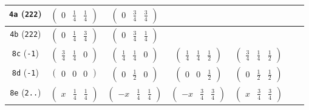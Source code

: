 \documentclass[fleqn,9pt,landscape]{jsarticle}
\begin{document}
\begin{center}
\begin{longtable}{ccccccc}
{\tt 4a} ({\tt 222}) & $ \begin{pmatrix} 0 & \frac{1}{4} & \frac{1}{4} \end{pmatrix} $ & $ \begin{pmatrix} 0 & \frac{3}{4} & \frac{3}{4} \end{pmatrix} $ & $  $ & $  $ & $  $ & $  $ \\ \hline
{\tt 4b} ({\tt 222}) & $ \begin{pmatrix} 0 & \frac{1}{4} & \frac{3}{4} \end{pmatrix} $ & $ \begin{pmatrix} 0 & \frac{3}{4} & \frac{1}{4} \end{pmatrix} $ & $  $ & $  $ & $  $ & $  $ \\ \hline
{\tt 8c} ({\tt -1}) & $ \begin{pmatrix} \frac{3}{4} & \frac{1}{4} & 0 \end{pmatrix} $ & $ \begin{pmatrix} \frac{1}{4} & \frac{1}{4} & 0 \end{pmatrix} $ & $ \begin{pmatrix} \frac{1}{4} & \frac{1}{4} & \frac{1}{2} \end{pmatrix} $ & $ \begin{pmatrix} \frac{3}{4} & \frac{1}{4} & \frac{1}{2} \end{pmatrix} $ & $  $ & $  $ \\ \hline
{\tt 8d} ({\tt -1}) & $ \begin{pmatrix} 0 & 0 & 0 \end{pmatrix} $ & $ \begin{pmatrix} 0 & \frac{1}{2} & 0 \end{pmatrix} $ & $ \begin{pmatrix} 0 & 0 & \frac{1}{2} \end{pmatrix} $ & $ \begin{pmatrix} 0 & \frac{1}{2} & \frac{1}{2} \end{pmatrix} $ & $  $ & $  $ \\ \hline
{\tt 8e} ({\tt 2..}) & $ \begin{pmatrix} x & \frac{1}{4} & \frac{1}{4} \end{pmatrix} $ & $ \begin{pmatrix} - x & \frac{1}{4} & \frac{1}{4} \end{pmatrix} $ & $ \begin{pmatrix} - x & \frac{3}{4} & \frac{3}{4} \end{pmatrix} $ & $ \begin{pmatrix} x & \frac{3}{4} & \frac{3}{4} \end{pmatrix} $ & $  $ & $  $ \\ \hline

\end{longtable}
\end{center}
\end{document}
